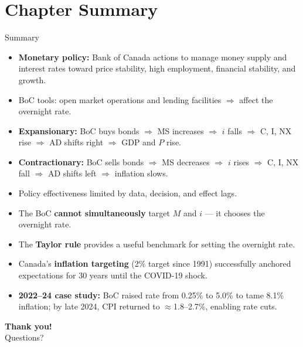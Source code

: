 \documentclass[aspectratio=169]{beamer}
\begin{document}
\section*{Chapter Summary}

\begin{frame}{Summary}
\transfade
\begin{itemize}
  \item \textbf{Monetary policy:} Bank of Canada actions to manage money supply and interest rates toward price stability, high employment, financial stability, and growth.
  \item BoC tools: open market operations and lending facilities $\Rightarrow$ affect the overnight rate.
  \item \textbf{Expansionary:} BoC buys bonds $\Rightarrow$ MS increases $\Rightarrow$ $i$ falls $\Rightarrow$ C, I, NX rise $\Rightarrow$ AD shifts right $\Rightarrow$ GDP and $P$ rise.
  \item \textbf{Contractionary:} BoC sells bonds $\Rightarrow$ MS decreases $\Rightarrow$ $i$ rises $\Rightarrow$ C, I, NX fall $\Rightarrow$ AD shifts left $\Rightarrow$ inflation slows.
  \item Policy effectiveness limited by data, decision, and effect lags.
  \item The BoC \textbf{cannot simultaneously} target $M$ and $i$ --- it chooses the overnight rate.
  \item The \textbf{Taylor rule} provides a useful benchmark for setting the overnight rate.
  \item Canada's \textbf{inflation targeting} (2\% target since 1991) successfully anchored expectations for 30 years until the COVID-19 shock.
  \item \textbf{2022--24 case study:} BoC raised rate from 0.25\% to 5.0\% to tame 8.1\% inflation; by late 2024, CPI returned to $\approx$1.8--2.7\%, enabling rate cuts.
\end{itemize}
\end{frame}

\begin{frame}
\centering
\Huge \textbf{Thank you!}\\[1em]
\large Questions?
\end{frame}
\end{document}
